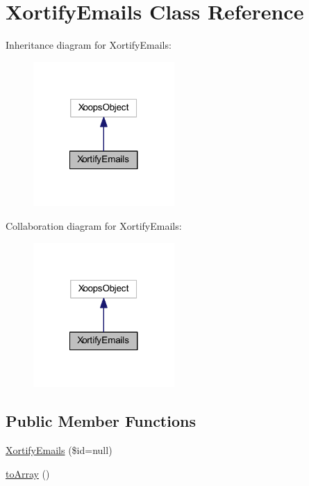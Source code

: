 \hypertarget{class_xortify_emails}{\section{Xortify\-Emails Class Reference}
\label{class_xortify_emails}
}


Inheritance diagram for Xortify\-Emails\-:
\nopagebreak
\begin{figure}[H]
\begin{center}
\leavevmode
\includegraphics[width=152pt]{class_xortify_emails__inherit__graph}
\end{center}
\end{figure}


Collaboration diagram for Xortify\-Emails\-:
\nopagebreak
\begin{figure}[H]
\begin{center}
\leavevmode
\includegraphics[width=152pt]{class_xortify_emails__coll__graph}
\end{center}
\end{figure}
\subsection*{Public Member Functions}
\begin{DoxyCompactItemize}
\item 
\hyperlink{class_xortify_emails_ab957a2cd087fd52a2718edf6cecca3ab}{Xortify\-Emails} (\$id=null)
\item 
\hyperlink{class_xortify_emails_a658defb34762c8f40085aec87e16ba1a}{to\-Array} ()
\end{DoxyCompactItemize}
